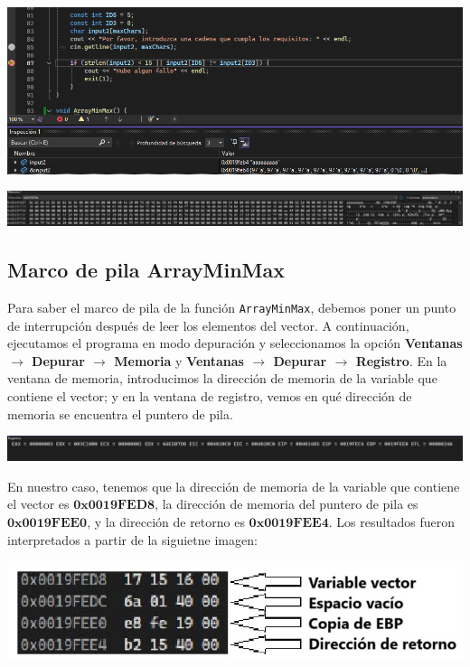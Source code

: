 \documentclass[11pt,a4paper]{article}
\begin{document}
\begin{center}
\includegraphics[width=\textwidth]{texto2.png}
\end{center}
\begin{center}
\includegraphics[width=\textwidth]{texto2Memoria.png}
\end{center}

\newpage

\subsection{Marco de pila ArrayMinMax}
Para saber el marco de pila de la función \texttt{ArrayMinMax}, debemos poner un punto de interrupción después de 
leer los elementos del vector. A continuación, ejecutamos el programa en modo depuración y seleccionamos la 
opción \textbf{Ventanas \(\rightarrow\) Depurar \(\rightarrow\) Memoria} y \textbf{Ventanas \(\rightarrow\) Depurar \(\rightarrow\) Registro}. 
En la ventana de memoria, introducimos la dirección de memoria de la variable que contiene el vector; y en la ventana de registro, vemos en qué dirección 
de memoria se encuentra el puntero de pila.
\begin{center}
  \includegraphics[width=\textwidth]{VentanaRegistros.png}
  \end{center}

\indent En nuestro caso, tenemos que la dirección de memoria de la variable que contiene el vector es \(\mathbf{0x0019FED8}\), la dirección de memoria del puntero de pila es \(\mathbf{0x0019FEE0}\), y la dirección de retorno es \(\mathbf{0x0019FEE4}\).
Los resultados fueron interpretados a partir de la siguietne imagen:
\begin{center}
\includegraphics[width=\textwidth]{VentanaMemoria.jpg}
\end{center}
\end{document}
